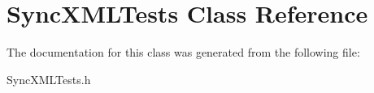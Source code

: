 \hypertarget{interface_sync_x_m_l_tests}{
\section{\-Sync\-X\-M\-L\-Tests \-Class \-Reference}
\label{interface_sync_x_m_l_tests}
}


\-The documentation for this class was generated from the following file\-:\begin{DoxyCompactItemize}
\item 
\-Sync\-X\-M\-L\-Tests.\-h\end{DoxyCompactItemize}
